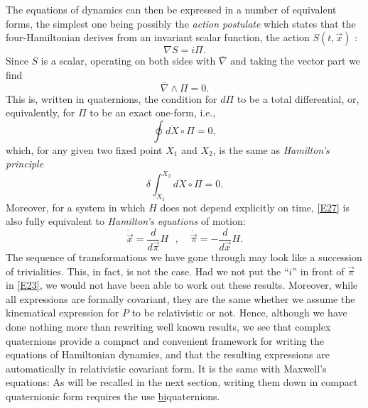 \documentclass [12pt,a4paper      ]{article}
\newcommand{\CON}{\overline}          %
\newcommand{\scal}{\circ}             %
\begin{document}
     The  equations of dynamics can then be expressed in a number 
of  equivalent forms,  the simplest one being possibly the \emph{action 
postulate} which  states that the four-Hamiltonian derives  from  an 
invariant scalar function, the action $S(t,\vec{x})$ :
%
\begin{equation}\label{E25}
                        \nabla S = i \Pi.        %
\end{equation}
%
Since $S$ is a scalar,  operating on both sides with  $\CON{\nabla}$ 
and taking the vector part we find
%
\begin{equation}\label{E26}
         \CON{\nabla} \wedge \Pi  =  0.   %
\end{equation}
%
This  is,  written in quaternions,  the condition for $d\Pi$ to be  a 
total differential, or, equivalently, for $\Pi$ to be an exact one-form, i.e.,
%
\begin{equation}\label{E27}
        \oint  \CON{dX} \scal \Pi   =  0,     %
\end{equation}
%
which,  for any given two fixed point $X_1$ and $X_2$, 
is the same as \emph{Hamilton's principle}
%
\begin{equation}\label{E28}
    \delta  \int_{X_1}^{X_2}  \CON{dX} \scal \Pi   =  0.   %
\end{equation}
%
Moreover,  for a system in which $H$ does not depend explicitly on 
time,  \eqref{E27} is also fully equivalent to \emph{Hamilton's equations} of 
motion:
%
\begin{equation}\label{E29}
   \dot{\vec{x}} = \frac{d}{d\vec{\pi}} H ~~~, ~~~~~   \dot{\vec{\pi}} = -\frac{d}{d\vec{x}} H.  %
\end{equation}
%
The  sequence  of transformations we have gone through  may  look 
like a succession of trivialities.   This,  in fact,  is not  the 
case. Had we not put the ``$i$'' in front of $\vec{\pi}$ in \eqref{E23}, we would  not  
have been able to work out  these results.   Moreover,  while all 
expressions  are formally covariant,  they are the same whether we 
assume  the  kinematical expression for $P$ to be  relativistic  or 
not.  Hence,  although  we have done nothing more than  rewriting 
well  known results,  we see that complex quaternions  provide  a 
compact  and  convenient framework for writing the  equations  of 
Hamiltonian  dynamics,  and  that the resulting  expressions  are 
automatically  in relativistic covariant form.   It is the same with 
Maxwell's equations:  As will be recalled in the next section, writing them 
down in compact quaternionic form requires the use \underline{bi}quaternions.
\end{document}
